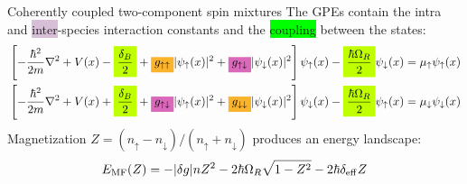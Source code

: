 \documentclass[aspectratio=169]{beamer}
\begin{document}

\begin{frame}{Coherently coupled two-component spin mixtures}
  The GPEs contain the \colorbox{Dandelion}{intra} and \colorbox{Thistle}{inter}-species interaction constants and the \colorbox{lime}{coupling} between the states:
  \begin{equation*}
    \begin{aligned}
        &\left[ -\frac{\hbar^2}{2m}\nabla^2 + V(x) - \colorbox{lime}{$\dfrac{\delta_B}{2}$} + \colorbox{Dandelion}{$g_{\uparrow\uparrow}$}|\psi_\uparrow(x)|^2 + \colorbox{Thistle}{$g_{\uparrow\downarrow}$}|\psi_\downarrow(x)|^2
        \right] \psi_\uparrow(x) - \colorbox{lime}{$\dfrac{\hbar\Omega_R}{2}$}\psi_\downarrow(x) = \mu_\uparrow \psi_\uparrow(x) \\
        &\left[ -\frac{\hbar^2}{2m}\nabla^2 + V(x) + \colorbox{lime}{$\dfrac{\delta_B}{2}$} + \colorbox{Thistle}{$g_{\uparrow\downarrow}$}|\psi_\uparrow(x)|^2 + \colorbox{Dandelion}{$g_{\downarrow\downarrow}$}|\psi_\downarrow(x)|^2
        \right] \psi_\downarrow(x) - \colorbox{lime}{$\dfrac{\hbar\Omega_R}{2}$}\psi_\uparrow(x) = \mu_\downarrow \psi_\downarrow(x)
    \end{aligned}
  \end{equation*}
  Magnetization $Z = (n_\uparrow-n_\downarrow)/(n_\uparrow+n_\downarrow)$ produces an energy landscape:
  \begin{equation*}
      E_{\rm MF}(Z) = -|\delta g|n Z^2 - 2\hbar\Omega_R \sqrt{1-Z^2} - 2\hbar\delta_{\rm eff} Z
      \label{eq:E_MF}
  \end{equation*}
\end{frame}
\end{document}
